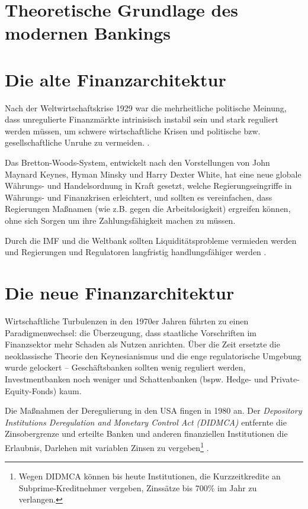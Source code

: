 \documentclass[a4paper,draft,11pt]{report}
\begin{document}
\section{Theoretische Grundlage des modernen Bankings}


\section{Die alte Finanzarchitektur}
Nach der Weltwirtschaftskrise 1929 war die mehrheitliche politische
Meinung, dass unregulierte
Finanzm\"arkte intrinisisch instabil sein und stark reguliert
werden m\"ussen, um schwere wirtschaftliche Krisen und politische bzw. gesellschaftliche
Unruhe zu vermeiden. \parencite[S. 563f.]{crottycam}.

Das Bretton-Woods-System,
entwickelt nach den Vorstellungen von John Maynard Keynes,
Hyman Minsky und Harry Dexter White, hat eine neue globale W\"ahrungs-
und Handelsordnung in Kraft gesetzt, welche Regierungseingriffe
in W\"ahrungs- und Finanzkrisen erleichtert, und sollten es
vereinfachen, dass Regierungen Maßnamen (wie z.B. gegen die Arbeitslosigkeit) ergreifen
k\"onnen, ohne sich Sorgen um ihre Zahlungsf\"ahigkeit machen zu m\"ussen.

Durch die IMF und die Weltbank sollten Liquidit\"atsprobleme
vermieden werden und Regierungen und Regulatoren langfristig handlungsf\"ahiger werden
\parencite[S. 31f.]{bordo}.

\section{Die neue Finanzarchitektur}
Wirtschaftliche Turbulenzen in den 1970er Jahren f\"uhrten
zu einen Paradigmenwechsel: die \"Uberzeugung, dass staatliche
Vorschriften im Finanzsektor mehr Schaden als Nutzen anrichten.
\"Uber die Zeit ersetzte die neoklassische Theorie den 
Keynesianismus und die enge regulatorische Umgebung wurde gelockert
-- Geschäftsbanken sollten wenig reguliert werden, Investmentbanken
noch weniger und Schattenbanken (bspw. Hedge- und Private-Equity-Fonds) kaum.

Die Maßnahmen der Deregulierung in den USA fingen in 1980 an. Der
\textit{Depository Institutions Deregulation and Monetary Control Act (DIDMCA)}
entfernte die Zinsobergrenze und erteilte Banken und anderen
finanziellen Institutionen die Erlaubnis, Darlehen mit variablen
 Zinsen zu vergeben\footnote{Wegen DIDMCA k\"onnen bis heute
 Institutionen, die Kurzzeitkredite an Subprime-Kreditnehmer
 vergeben, Zinss\"atze bis 700\% im Jahr zu verlangen.}
\parencite[6--8]{sherman2009short}.
\end{document}
